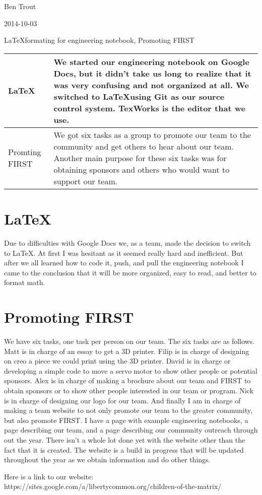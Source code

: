 Ben Trout

2014-10-03

\LaTeX formating for engineering notebook, Promoting FIRST

\begin{tabular}{|p{5cm}|p{5cm}|}
 \hline
 \LaTeX&
 We started our engineering notebook on Google Docs, but it didn't take us long to realize that it was very confusing and not organized at all. We switched to \LaTeX using Git as our source control system. TexWorks is the editor that we use. 
 \\ 
 \hline
 Promting FIRST&
 We got six tasks as a group to promote our team to the community and get others to hear about our team. Another main purpose for these six tasks was for obtaining sponsors and others who would want to support our team. 
 \\
 \hline
\end{tabular} 

\section*{\LaTeX}
Due to difficulties with Google Docs we, as a team, made the decision to switch to \LaTeX. At first I was hesitant as it seemed really hard and inefficient. But after we all learned how to code it, push, and pull the engineering notebook I came to the conclusion that it will be more organized, easy to read, and better to format math. 

\section* {Promoting FIRST}
We have six tasks, one task per person on our team. The six tasks are as follows. Matt is in charge of an essay to get a 3D printer. Filip is in charge of designing on creo a piece we could print using the 3D printer. David is in charge or developing a simple code to move a servo motor to show other people or potential sponsors. Alex is in charge of making a brochure about our team and FIRST to obtain sponsors or to show other people interested in our team or program. Nick is in charge of designing our logo for our team. And finally I am in charge of making a team website to not only promote our team to the greater community, but also promote FIRST. I have a page with example engineering notebooks, a page describing our team, and a page describing our community outreach through out the year. There isn't a whole lot done yet with the website other than the fact that it is created. The website is a build in progress that will be updated throughout the year as we obtain information and do other things. 

Here is a link to our website: https://sites.google.com/a/libertycommon.org/children-of-the-matrix/
  

